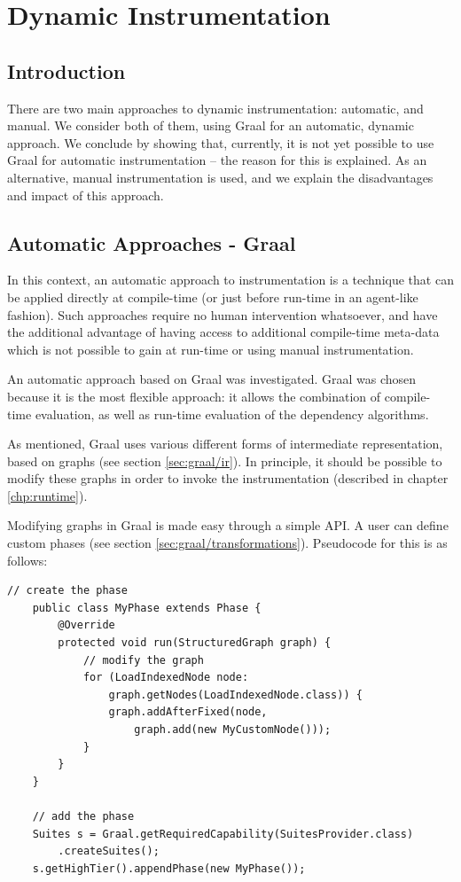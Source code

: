 \chapter{Dynamic Instrumentation} \label{chp:instrumentation}
\section{Introduction} \label{sec:instrumentation/introduction}
There are two main approaches to dynamic instrumentation: automatic, and manual. We consider both of them, using Graal for an automatic, dynamic approach. We conclude by showing that, currently, it is not yet possible to use Graal for automatic instrumentation -- the reason for this is explained. As an alternative, manual instrumentation is used, and we explain the disadvantages and impact of this approach.

\section{Automatic Approaches - Graal} \label{sec:instrumentation/automatic}
	In this context, an automatic approach to instrumentation is a technique that can be applied directly at compile-time (or just before run-time in an agent-like fashion). Such approaches require no human intervention whatsoever, and have the additional advantage of having access to additional compile-time meta-data which is not possible to gain at run-time or using manual instrumentation.

	An automatic approach based on Graal was investigated. Graal was chosen because it is the most flexible approach: it allows the combination of compile-time evaluation, as well as run-time evaluation of the dependency algorithms.
	
	As mentioned, Graal uses various different forms of intermediate representation, based on graphs (see section \ref{sec:graal/ir}). In principle, it should be possible to modify these graphs in order to invoke the instrumentation (described in chapter \ref{chp:runtime}).
	
	Modifying graphs in Graal is made easy through a simple API. A user can define custom phases (see section \ref{sec:graal/transformations}). Pseudocode for this is as follows:
	
	\begin{lstlisting}[caption=Sample code for adding a phase and manipulating a graph,label=list:graph-trans]
	// create the phase
	public class MyPhase extends Phase {
	    @Override
	    protected void run(StructuredGraph graph) {
	        // modify the graph
	        for (LoadIndexedNode node:
	            graph.getNodes(LoadIndexedNode.class)) {
	            graph.addAfterFixed(node,
	                graph.add(new MyCustomNode()));
	        }
	    }
	}
	
	// add the phase
	Suites s = Graal.getRequiredCapability(SuitesProvider.class)
	    .createSuites();
	s.getHighTier().appendPhase(new MyPhase());
	\end{lstlisting}
	
